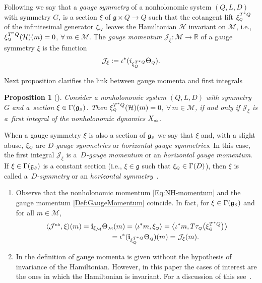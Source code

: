 \documentclass[pdftex]{sigma}
\numberwithin{equation}{section}
\newtheorem{Proposition}[Theorem]{Proposition}
 { \theoremstyle{definition}
\newtheorem{Definition}[Theorem]{Definition}
\newtheorem{Example}[Theorem]{Example}
\newtheorem{Remark}[Theorem]{Remark}
\newtheorem{Remarks}[Theorem]{Remarks} }
\def\M{\mathcal{M}}
\def\J{\mathcal{J}}
\def\Ham{\mathcal{H}}
\def\R{\mathbb{R}}
\def\g{\mathfrak{g}}
\def\nh{{\mbox{\tiny{nh}}}}
\def\subM{{\mbox{\tiny{$\M$}}}}
\def\subSS{{\mbox{\tiny{$S$}}}}
\def\subQQ{{\mbox{\tiny{$Q$}}}}
\begin{document}
Following \cite{FSG2008,FSG2009} we say that a {\it gauge symmetry}
of a nonholonomic system $(Q,L,D)$ with symmetry $G$, is a
section $\xi$ of $\g\times Q\to Q$ such that the cotangent lift
$\xi_{\mbox{\tiny{$Q$}}}^{T^*Q}$ of the inf\/initesimal generator
$\xi_{\mbox{\tiny{$Q$}}}$ leaves the Hamiltonian $\Ham$ invariant on $\M$, i.e.,
$\xi_{\mbox{\tiny{$Q$}}}^{T^*Q}(\Ham)(m) = 0$, $\forall\, m\in \M$.
The {\it gauge momentum}
${\mathcal J}_\xi\colon \M\to \R$ of a gauge symmetry $\xi$ is the function
 \begin{gather}\label{Def:GaugeMomentum}
    {\mathcal J}_\xi := \iota^*(i_{\xi^{T^*Q}_{\mbox{\tiny{$Q$}}}}  \Theta_{\mbox{\tiny{$Q$}}})  .
 \end{gather}

Next proposition clarif\/ies the link between gauge momenta and f\/irst integrals

\begin{Proposition}[\cite{FRS2007}]\label{Prop:FRS}
 Consider a nonholonomic system $(Q,L,D)$ with symmetry $G$ and a~section
 $\xi\in \Gamma(\g_\subSS)$. Then $\xi_{\mbox{\tiny{$Q$}}}^{T^*Q} (\Ham) (m) = 0$, $\forall\, m\in\M$,  if and only if
 ${\mathcal J}_\xi$ is a~first integral of the nonholonomic dynamics $X_{\emph\nh}$.
\end{Proposition}

When a gauge symmetry $\xi$ is also a section of $\g_\subSS$
we say that $\xi$ and, with a slight abuse, $\xi_{\mbox{\tiny{$Q$}}}$
are {\it $D$-gauge symmetries} or {\it horizontal gauge symmetries}.
In this case, the f\/irst integral $\J_\xi$ is a~{\it $D$-gauge momentum} or an
{\it horizontal gauge momentum}. If $\xi \in \Gamma( \mathfrak{g}_\subSS)$
is a constant section (i.e., $\xi \in \mathfrak{g}$ such that
$\xi_{\subQQ} \in \Gamma(D)$), then $\xi$ is called a~{\it $D$-symmetry} or an
{\it horizontal symmetry}~\cite{BKMM,FSG2008}.

\begin{Remarks}\quad
  \begin{enumerate}\itemsep=0pt
    \item[$(i)$] Observe that the nonholonomic momentum \eqref{Eq:NH-momentum}
    and the gauge momentum \eqref{Def:GaugeMomentum} coincide. In fact,
    for $\xi\in \Gamma(\g_\subSS)$ and for all $m\in \M$,
    \begin{gather*} \langle \J^\nh, \xi\rangle (m)  =
      {\bf i}_{\xi_\subM}
      \Theta_\subM (m) = \langle \iota^*m,  \xi_\subQQ \rangle =  \big\langle \iota^* m,
      T\tau_\subQQ \big( \xi_\subQQ^{T^*Q} \big) \big\rangle \\
      \hphantom{\langle \J^\nh, \xi\rangle (m) }{}
      =  \iota^*({\bf i}_{\xi^{T^*Q}_{\mbox{\tiny{$Q$}}}}
      \Theta_{\mbox{\tiny{$Q$}}}) (m)= \J_\xi(m).
    \end{gather*}
    \item[$(ii)$] In \cite{FSG2012} the def\/inition of gauge momenta is given without the
    hypothesis of invariance of the Hamiltonian. However, in this paper the cases
    of interest are the ones in which the Hamiltonian is invariant.
    For a discussion of this see~\cite{FSG2012}.
  \end{enumerate}
\end{Remarks}
\end{document}

